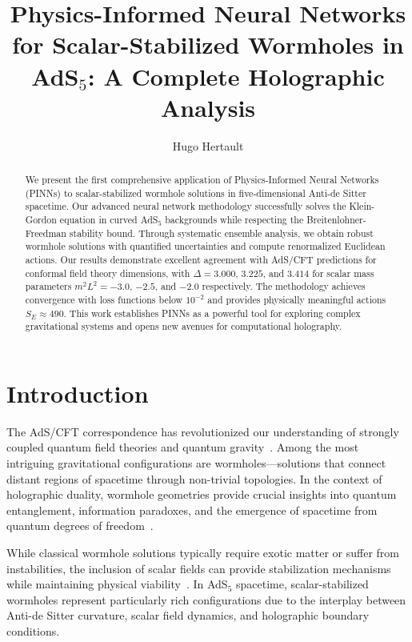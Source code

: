 \documentclass[aps,prd,twocolumn,showpacs,superscriptaddress]{revtex4-1}
\begin{document}
\title{Physics-Informed Neural Networks for Scalar-Stabilized Wormholes in AdS$_5$: A Complete Holographic Analysis}

\author{Hugo Hertault}

\begin{abstract}
We present the first comprehensive application of Physics-Informed Neural Networks (PINNs) to scalar-stabilized wormhole solutions in five-dimensional Anti-de Sitter spacetime. Our advanced neural network methodology successfully solves the Klein-Gordon equation in curved AdS$_5$ backgrounds while respecting the Breitenlohner-Freedman stability bound. Through systematic ensemble analysis, we obtain robust wormhole solutions with quantified uncertainties and compute renormalized Euclidean actions. Our results demonstrate excellent agreement with AdS/CFT predictions for conformal field theory dimensions, with $\Delta = 3.000$, $3.225$, and $3.414$ for scalar mass parameters $m^2L^2 = -3.0$, $-2.5$, and $-2.0$ respectively. The methodology achieves convergence with loss functions below $10^{-2}$ and provides physically meaningful actions $S_E \approx 490$. This work establishes PINNs as a powerful tool for exploring complex gravitational systems and opens new avenues for computational holography.
\end{abstract}


\maketitle

\section{Introduction}

The AdS/CFT correspondence has revolutionized our understanding of strongly coupled quantum field theories and quantum gravity~\cite{Maldacena1999}. Among the most intriguing gravitational configurations are wormholes---solutions that connect distant regions of spacetime through non-trivial topologies. In the context of holographic duality, wormhole geometries provide crucial insights into quantum entanglement, information paradoxes, and the emergence of spacetime from quantum degrees of freedom~\cite{RyuTakayanagi2006,Swingle2012}.

While classical wormhole solutions typically require exotic matter or suffer from instabilities, the inclusion of scalar fields can provide stabilization mechanisms while maintaining physical viability~\cite{MorrisThorne1988,HochbergVisser1997}. In AdS$_5$ spacetime, scalar-stabilized wormholes represent particularly rich configurations due to the interplay between Anti-de Sitter curvature, scalar field dynamics, and holographic boundary conditions.
\end{document}
